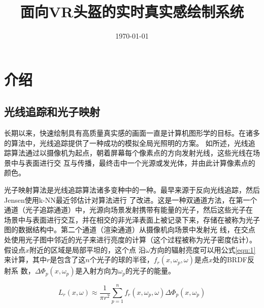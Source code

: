 \documentclass[UTF8]{ctexart}
\title{面向VR头盔的实时真实感绘制系统}
\author{}
\date{\today}
\begin{document}
\maketitle
\begin{abstract}
  
\end{abstract}

\section{介绍}
    \subsection{光线追踪和光子映射}
        长期以来，快速绘制具有高质量真实感的画面一直是计算机图形学的目标。在诸多的算法中，光线追踪提供了一种成功的模拟全局光照明的方案。
        如\cite{GlobalIllumination}所述，光线追踪算法通过以摄像机为起点，朝着屏幕每个像素点的方向发射光线，这些光线在场景中与表面进行交
        互与传播，最终击中一个光源或发光体，并由此计算像素点的颜色。
        
        光子映射算法是光线追踪算法诸多变种中的一种。最早来源于反向光线追踪\cite{ARVO1986Backward}，然后Jensen使用k-NN最近邻估计对算法进行
        了改进\cite{Jensen1996Global}。这是一种双通道方法，在第一个通道（光子追踪通道）中，光源向场景发射携带有能量的光子，然后这些光子在
        场景中与表面进行交互，并在相交的非光泽表面上被记录下来，存储在被称为光子图的数据结构中。第二个通道（渲染通道）从摄像机向场景中发射光
        线，在交点处使用光子图中邻近的光子来进行亮度的计算（这个过程被称为光子密度估计）。假设点$x$附近的区域是局部平坦的，这个点
        沿$\omega$方向的辐射亮度可以用公式\ref{equ:1}来计算，其中$r$是包含了这$n$个光子的球的半径，$f_r(x,\omega_p,\omega)$是点$x$处的BRDF反射系
        数，$\Delta\Phi_p(x,\omega_p)$是入射方向为$\omega_p$的光子的能量。
        
        \begin{equation}
        L_r(x,\omega)\approx\frac{1}{\pi r^2}\sum_{p=1}^nf_r(x,\omega_p,\omega)\Delta\Phi_p(x,\omega_p)
        \label{equ:1}
        \end{equation}
\end{document}
